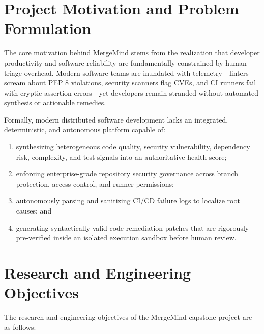 \documentclass[12pt,a4paper,oneside]{report}
\begin{document}
\section{Project Motivation and Problem Formulation}
\label{sec:motivation}

The core motivation behind MergeMind stems from the realization that developer productivity and software reliability are fundamentally constrained by human triage overhead. Modern software teams are inundated with telemetry---linters scream about PEP 8 violations, security scanners flag CVEs, and CI runners fail with cryptic assertion errors---yet developers remain stranded without automated synthesis or actionable remedies.

Formally, modern distributed software development lacks an integrated, deterministic, and autonomous platform capable of:
\begin{enumerate}[label=(\alph*)]
    \item synthesizing heterogeneous code quality, security vulnerability, dependency risk, complexity, and test signals into an authoritative health score;
    \item enforcing enterprise-grade repository security governance across branch protection, access control, and runner permissions;
    \item autonomously parsing and sanitizing CI/CD failure logs to localize root causes; and
    \item generating syntactically valid code remediation patches that are rigorously pre-verified inside an isolated execution sandbox before human review.
\end{enumerate}

\section{Research and Engineering Objectives}
\label{sec:objectives}

The research and engineering objectives of the MergeMind capstone project are as follows:
\end{document}
